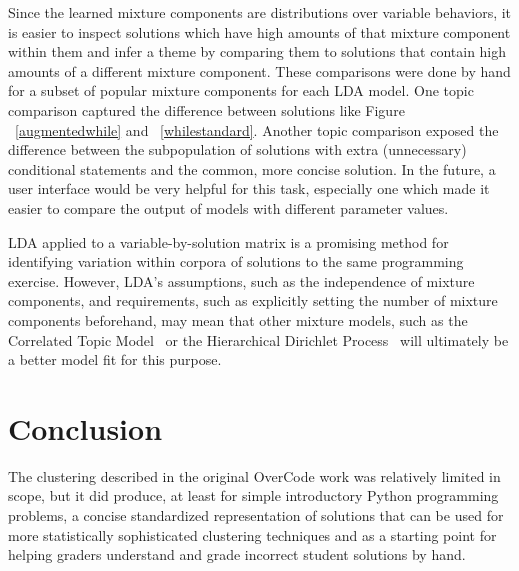 Since the learned mixture components are distributions over variable behaviors, it is easier to inspect solutions which have high amounts of that mixture component within them and infer a theme by comparing them to solutions that contain high amounts of a different mixture component. These comparisons were done by hand for a subset of popular mixture components for each LDA model. One topic comparison captured the difference between solutions like Figure ~\ref{augmentedwhile} and ~\ref{whilestandard}. Another topic comparison exposed the difference between the subpopulation of solutions with extra (unnecessary) conditional statements and the common, more concise solution. In the future, a user interface would be very helpful for this task, especially one which made it easier to compare the output of models with different parameter values. 

LDA applied to a variable-by-solution matrix is a promising method for identifying variation within corpora of solutions to the same programming exercise. However, LDA's assumptions, such as the independence of mixture components, and requirements, such as explicitly setting the number of mixture components beforehand, may mean that other mixture models, such as the Correlated Topic Model~\cite{} or the Hierarchical Dirichlet Process~\cite{} will ultimately be a better model fit for this purpose.



\section{Conclusion}
The clustering described in the original OverCode work was relatively limited in scope, but it did produce, at least for simple introductory Python programming problems, a concise standardized representation of solutions that can be used for more statistically sophisticated clustering techniques and as a starting point for helping graders understand and grade incorrect student solutions by hand.

